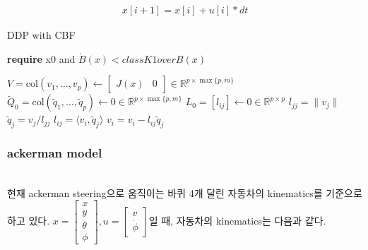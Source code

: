 \documentclass[journal]{IEEEtran}
\begin{document}
	\begin{align}
		x[i+1]=x[i]+u[i]*dt	
		\label{eq:simple_case_discrete}
	\end{align}
	
\begin{algorithm}[H]
	\caption{DDP with CBF}
	\textbf{require} x0 and $\dot{B}(x) < class K {{1}over{B(x)}}$
	\begin{algorithmic}[1]
		\State $V = \mathrm{col}(v_1,\dots,v_{p}) \gets \begin{bmatrix} J(x) & 0 \end{bmatrix}\in\mathbb{R}^{{p}\times\max\{{p},{m}\}}$
		\State $\tilde{Q}_0 = \mathrm{col}(\tilde{ q }_1,\dots,\tilde{ q }_{p}) \gets 0 \in \mathbb{R}^{{p}\times\max\{{p},{m}\}}$
		\State $L_0 = [l_{ij}] \gets 0\in\mathbb{R}^{{p}\times {p}}$
		\State $l_{jj} = \|v_j\|$
		\State $\tilde{ q }_j = v_j / l_{jj}$
		\State $l_{ij} = \langle v_i,\tilde{ q }_j\rangle$
		\State $v_i = v_i - l_{ij}\tilde{ q }_j$
		\EndFor
		\EndIf
		\EndIf
		\EndFor
	\end{algorithmic}
	\label{alg:find_qr_decomposition}
\end{algorithm}
	
	
	
	
	
	
	
	\subsubsection{ackerman model}
	\mbox{}\\
	현재 ackerman steering으로 움직이는 바퀴 4개 달린 자동차의 kinematics를 기준으로 하고 있다. 
	$x=\begin{bmatrix*} x\\y\\\theta\\\phi \end{bmatrix*},u=\begin{bmatrix*}v\\\dot{\phi} \end{bmatrix*}$일 때,
	자동차의 kinematics는 다음과 같다.
	
\end{document}
